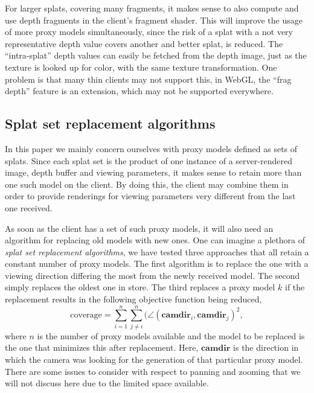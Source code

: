 For larger splats, covering many fragments, it makes sense to also compute and
use depth fragments in the client's fragment shader. This will improve the usage
of more proxy models simultaneously, since the risk of a splat with a not very
representative depth value covers another and better splat, is reduced. The
``intra-splat'' depth values can easily be fetched from the depth image, just as
the texture is looked up for color, with the same texture transformation. One
problem is that many thin clients may not support this, in WebGL, the ``frag
depth'' feature is an extension, which may not be supported everywhere.


\subsection{Splat set replacement algorithms}
\label{sec:proxyModelReplacement}

In this paper we mainly concern ourselves with proxy models defined as sets of
splats. Since each splat set is the product of one instance of a server-rendered
image, depth buffer and viewing parameters, it makes sense to retain more than
one such model on the client. By doing this, the client may combine them in
order to provide renderings for viewing parameters very different from the last
one received.

As soon as the client has a set of such proxy models, it will also need an
algorithm for replacing old models with new ones.  One can imagine a plethora of
{\em splat set replacement algorithms}, we have tested three approaches that all
retain a constant number of proxy models. The first algorithm is to replace the
one with a viewing direction differing the most from the newly received
model. The second simply replaces the oldest one in store. The third replaces a
proxy model $k$ if the replacement results in the following objective function
being reduced,
\[
  \text{coverage} =
  \sum_{i=1}^n 
    \sum_{j\neq i}^n 
      ( \angle(\textbf{camdir}_i, \textbf{camdir}_j )^2,
\]
where $n$ is the number of proxy models available and the model to be replaced
is the one that minimizes this after replacement.
Here, $\textbf{camdir}$ is the direction in which the camera was looking for the
generation of that particular proxy model.  There are some issues to consider
with respect to panning and zooming that we will not discuss here due to the
limited space available.


